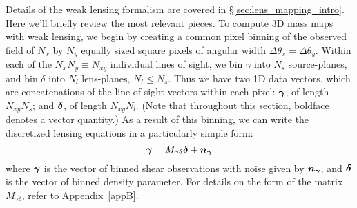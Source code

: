 Details of the weak lensing formalism are covered in
\S\ref{sec:lens_mapping_intro}.  Here we'll briefly review the
most relevant pieces.
To compute 3D mass maps with weak lensing, we begin by
creating a common pixel binning of the observed field of 
$N_x$ by $N_y$ equally sized square pixels
of angular width $\Delta\theta_x = \Delta\theta_y$.  
Within each of the $N_x N_y \equiv N_{xy}$ individual
lines of sight, we bin $\gamma$ into $N_s$ source-planes,
and bin $\delta$ into $N_l$ lens-planes, $N_l \le N_s$.  
Thus we have two 1D data vectors, which are concatenations of
the line-of-sight vectors within each pixel:
 $\boldsymbol{\gamma}$, of length $N_{xy} N_s$; 
and $\boldsymbol{\delta}$, of length $N_{xy} N_l$.  
(Note that throughout this section, boldface denotes a vector quantity.)  
As a result of this binning, we can write the discretized lensing 
equations in a particularly simple form:
\begin{equation}
  \label{M_gd}
  \boldsymbol{\gamma} = M_{\gamma\delta}\boldsymbol{\delta} + \boldsymbol{n_\gamma}
\end{equation}
where $\boldsymbol{\gamma}$ is the vector of binned shear observations with noise
given by $\boldsymbol{n_\gamma}$, and $\boldsymbol{\delta}$ is the vector 
of binned density parameter.  For details on the form of 
the matrix $M_{\gamma\delta}$, refer to Appendix~\ref{appB}.

